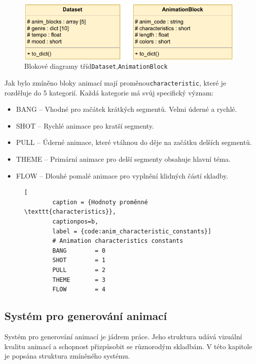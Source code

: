\begin{figure}[H]
    \centering
    \includegraphics[width = 0.7\linewidth]{obrazky/UML_diagram_Dataset_and_AnimationBlock.pdf}
    \caption{Blokové diagramy tříd\texttt{Dataset},\texttt{AnimationBlock}}
    \label{fig:UML_diagram_Dataset_AnimationBlock}
\end{figure}

Jak bylo zmíněno bloky animací mají proměnou\texttt{characteristic}, které je rozděluje do 5 kategorií. Každá kategorie má svůj specifický význam: 

\begin{itemize}
    \item BANG -- Vhodné pro začátek krátkých segmentů. Velmi úderné a rychlé.
    \item SHOT -- Rychlé animace pro kratší segmenty.
    \item PULL -- Úderné animace, které vtáhnou do děje na začátku delších segmentů.
    \item THEME -- Primární animace pro delší segmenty obsahuje hlavní téma.
    \item FLOW -- Dlouhé pomalé animace pro vyplnění klidných částí skladby.
\end{itemize}

\begin{figure}[H]
    \begin{lstlisting}[
        caption = {Hodnoty proměnné \texttt{characteristics}},
        captionpos=b,
        label = {code:anim_characteristic_constants}]
        # Animation characteristics constants
        BANG        = 0
        SHOT        = 1
        PULL        = 2
        THEME       = 3
        FLOW        = 4
    \end{lstlisting}
\end{figure}

\subsection{Systém pro generování animací} \label{sec:System_generovani_animaci}

Systém pro generování animací je jádrem práce. Jeho struktura udává vizuální kvalitu animací a schopnost přizpůsobit se různorodým skladbám. V této kapitole je popsána struktura zmíněného systému. 

